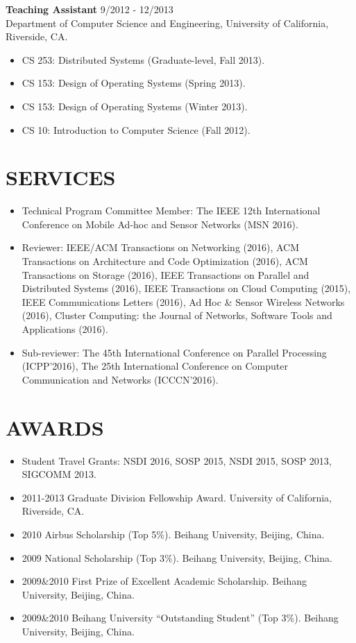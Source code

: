 \documentclass[zhemargin]{res}
\begin{document}
\begin{resume}
	\textbf{Teaching Assistant} \hfill 9/2012 - 12/2013 \\
	Department of Computer Science and Engineering, University of California, Riverside, CA.
	\begin{itemize}
	\item CS 253: Distributed Systems (Graduate-level, Fall 2013).
	\item CS 153: Design of Operating Systems (Spring 2013).
	\item CS 153: Design of Operating Systems (Winter 2013).
	\item CS 10: Introduction to Computer Science (Fall 2012).
	\end{itemize}

\section{\small SERVICES}
	\begin{itemize}[leftmargin=*, topsep=-10pt] %
    \item Technical Program Committee Member: The IEEE 12th International Conference on Mobile Ad-hoc and Sensor Networks (MSN 2016).
    \item Reviewer: IEEE/ACM Transactions on Networking (2016), ACM Transactions on Architecture and Code Optimization (2016), ACM Transactions on Storage (2016), IEEE Transactions on Parallel and Distributed Systems (2016), IEEE Transactions on Cloud Computing (2015), IEEE Communications Letters (2016), Ad Hoc \& Sensor Wireless Networks (2016), Cluster Computing: the Journal of Networks, Software Tools and Applications (2016).
    \item Sub-reviewer: The 45th International Conference on Parallel Processing (ICPP'2016), The 25th International Conference on Computer Communication and Networks (ICCCN'2016).
	\end{itemize}

\section{\small AWARDS}
	\begin{itemize}[leftmargin=*, topsep=-10pt] %
    \item Student Travel Grants: NSDI 2016, SOSP 2015, NSDI 2015, SOSP 2013, SIGCOMM 2013.
	\item 2011-2013 Graduate Division Fellowship Award. University of California, Riverside, CA.
	\item 2010 Airbus Scholarship (Top 5\%). Beihang University, Beijing, China.
	\item 2009 National Scholarship (Top 3\%). Beihang University, Beijing, China.
	\item 2009\&2010 First Prize of Excellent Academic Scholarship. Beihang University, Beijing, China.
	\item 2009\&2010 Beihang University “Outstanding Student” (Top 3\%). Beihang University, Beijing, China.
	\end{itemize}


\end{resume}
\end{document}
